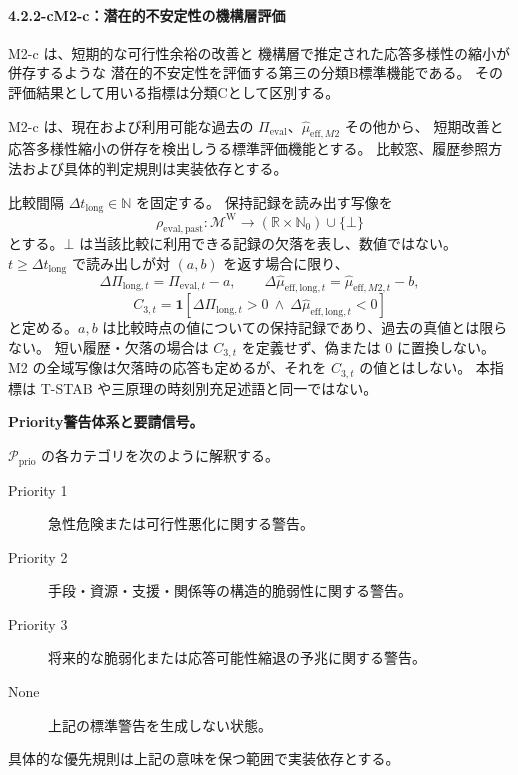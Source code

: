 \paragraph*{4.2.2-c\quad M2-c：潜在的不安定性の機構層評価}

M2-c は、短期的な可行性余裕の改善と
機構層で推定された応答多様性の縮小が併存するような
潜在的不安定性を評価する第三の分類B標準機能である。
その評価結果として用いる指標は分類Cとして区別する。

\begin{definition}
\label{def:m2c_latent_function}
M2-c は、現在および利用可能な過去の
$\Pi_{\mathrm{eval}}$、$\hat\mu_{\mathrm{eff},M2}$ その他から、
短期改善と応答多様性縮小の併存を検出しうる標準評価機能とする。
比較窓、履歴参照方法および具体的判定規則は実装依存とする。
\end{definition}

\begin{definition}
\label{def:m2_latent_instability}
比較間隔 $\Delta t_{\mathrm{long}}\in\mathbb N$ を固定する。
保持記録を読み出す写像を
\[
\rho_{\mathrm{eval,past}}:\mathcal M^{\mathrm W}\to
 (\mathbb R\times\mathbb N_0)\cup\{\bot\}
\]
とする。$\bot$ は当該比較に利用できる記録の欠落を表し、数値ではない。
$t\ge\Delta t_{\mathrm{long}}$ で読み出しが対 $(a,b)$ を返す場合に限り、
\[
\Delta\Pi_{\mathrm{long},t}=\Pi_{\mathrm{eval},t}-a,\qquad
\Delta\hat\mu_{\mathrm{eff,long},t}=\hat\mu_{\mathrm{eff},M2,t}-b,
\]
\[
 C_{3,t}=\mathbf1[\Delta\Pi_{\mathrm{long},t}>0\ \wedge\
 \Delta\hat\mu_{\mathrm{eff,long},t}<0]
\]
と定める。$a,b$ は比較時点の値についての保持記録であり、過去の真値とは限らない。
短い履歴・欠落の場合は $C_{3,t}$ を定義せず、偽または $0$ に置換しない。
M2 の全域写像は欠落時の応答も定めるが、それを $C_{3,t}$ の値とはしない。
本指標は T-STAB や三原理の時刻別充足述語と同一ではない。
\end{definition}

\noindent\textbf{Priority警告体系と要請信号。}

\begin{definition}
\label{def:m2_priority}
$\mathcal P_{\mathrm{prio}}$ の各カテゴリを次のように解釈する。
\begin{description}
  \item[Priority 1] 急性危険または可行性悪化に関する警告。
  \item[Priority 2] 手段・資源・支援・関係等の構造的脆弱性に関する警告。
  \item[Priority 3] 将来的な脆弱化または応答可能性縮退の予兆に関する警告。
  \item[None] 上記の標準警告を生成しない状態。
\end{description}
具体的な優先規則は上記の意味を保つ範囲で実装依存とする。
\end{definition}

